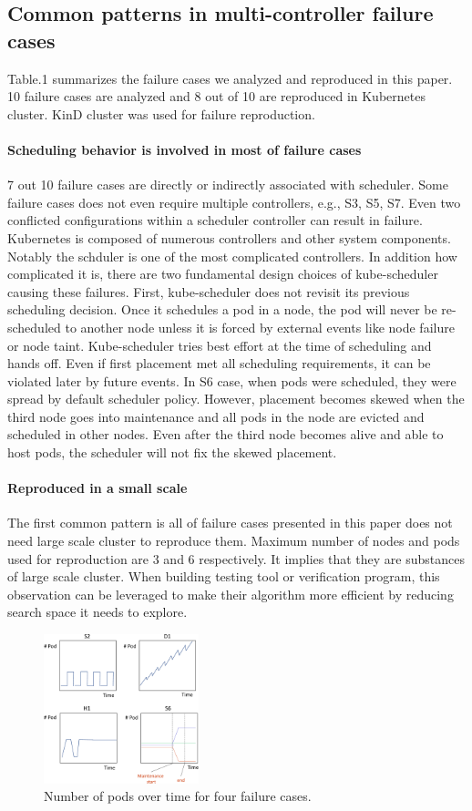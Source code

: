 \subsection*{Common patterns in multi-controller failure cases}
Table.1 summarizes the failure cases we analyzed and reproduced in this paper. 10 failure cases are analyzed and 8 out of 10 are reproduced in Kubernetes cluster. KinD cluster was used for failure reproduction.

\paragraph*{Scheduling behavior is involved in most of failure cases} 7 out 10 failure cases are directly or indirectly associated with scheduler. Some failure cases does not even require multiple controllers, e.g., S3, S5, S7. Even two conflicted configurations within a scheduler controller can result in failure. Kubernetes is composed of numerous controllers and other system components. Notably the schduler is one of the most complicated controllers. In addition how complicated it is, there are two fundamental design choices of kube-scheduler causing these failures. First, kube-scheduler does not revisit its previous scheduling decision. Once it schedules a pod in a node, the pod will never be re-scheduled to another node unless it is forced by external events like node failure or node taint. Kube-scheduler tries best effort at the time of scheduling and hands off. Even if first placement met all scheduling requirements, it can be violated later by future events. In S6 case, when pods were scheduled, they were spread by default scheduler policy. However, placement becomes skewed when the third node goes into maintenance and all pods in the node are evicted and scheduled in other nodes. Even after the third node becomes alive and able to host pods, the scheduler will not fix the skewed placement. 

\paragraph*{Reproduced in a small scale} The first common pattern is all of failure cases presented in this paper does not need large scale cluster to reproduce them. Maximum number of nodes and pods used for reproduction are 3 and 6 respectively. It implies that they are substances of large scale cluster. When building testing tool or verification program, this observation can be leveraged to make their algorithm more efficient by reducing search space it needs to explore.


\begin{figure}[h]
    \centering
    \includegraphics[width=0.4\textwidth]{figure/num_pod.pdf}
    \caption{Number of pods over time for four failure cases.}
    \label{fig:num_pod}
\end{figure}
